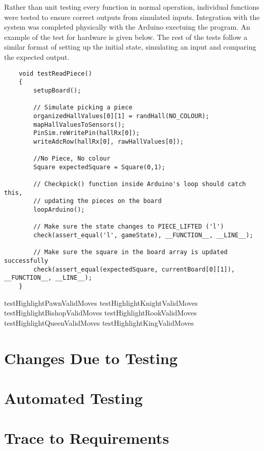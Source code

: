 \documentclass[12pt, titlepage]{article}
\begin{document}
  Rather than unit testing every function in normal operation, individual functions were tested to ensure correct outputs from simulated inputs. Integration 
  with the system was completed physically with the Arduino exectuing the program. An example of the test for hardware is given below. The rest of the tests follow
  a similar format of setting up the initial state, simulating an input and comparing the expected output.

  
\begin{lstlisting}
    void testReadPiece()
    {
        setupBoard(); 
        
        // Simulate picking a piece 
        organizedHallValues[0][1] = randHall(NO_COLOUR);  
        mapHallValuesToSensors(); 
        PinSim.reWritePin(hallRx[0]); 
        writeAdcRow(hallRx[0], rawHallValues[0]); 

        //No Piece, No colour 
        Square expectedSquare = Square(0,1);    

        // Checkpick() function inside Arduino's loop should catch this,
        // updating the pieces on the board 
        loopArduino();  

        // Make sure the state changes to PIECE_LIFTED ('l')
        check(assert_equal('l', gameState), __FUNCTION__, __LINE__);  

        // Make sure the square in the board array is updated successfully
        check(assert_equal(expectedSquare, currentBoard[0][1]), __FUNCTION__, __LINE__);  
    }
\end{lstlisting}

testHighlightPawnValidMoves
testHighlightKnightValidMoves
testHighlightBishopValidMoves
testHighlightRookValidMoves
testHighlightQueenValidMoves
testHighlightKingValidMoves

\section{Changes Due to Testing}

\section{Automated Testing}
		
\section{Trace to Requirements}
\end{document}
